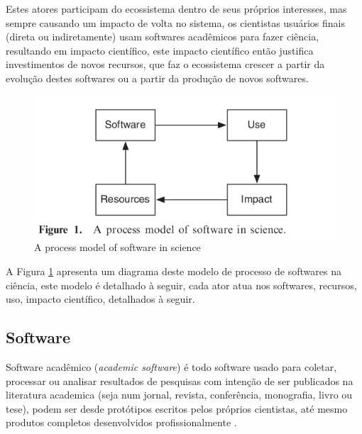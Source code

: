 Estes atores participam do ecossistema dentro de seus próprios interesses, mas
sempre causando um impacto de volta no sistema, os cientistas usuários finais
(direta ou indiretamente) usam softwares acadêmicos para fazer ciência,
resultando em impacto científico, este impacto científico então justifica
investimentos de novos recursos, que faz o ecossistema crescer a partir da
evolução destes softwares ou a partir da produção de novos softwares.

\begin{figure}[h]
  \center
  \includegraphics[scale=0.5]{imagens/process-model-scientific-software.png}
  \caption{A process model of software in science \cite{howison2015understanding}}
  \label{process-model-scientific-software}
\end{figure}

A Figura \ref{process-model-scientific-software} apresenta um diagrama deste
modelo de processo de softwares na ciência, este modelo é detalhado à seguir,
cada ator atua nos softwares, recursos, uso, impacto científico, detalhados à
seguir.

%

\subsection{Software}

Software acadêmico ({\it academic software}) é todo software usado para
coletar, processar ou analisar resultados de pesquisas com intenção de ser
publicados na literatura academica (seja num jornal, revista, conferência,
monografia, livro ou tese), podem ser desde protótipos escritos pelos próprios
cientistas, até mesmo produtos completos desenvolvidos profissionalmente
\cite{allen2017engineering}.


